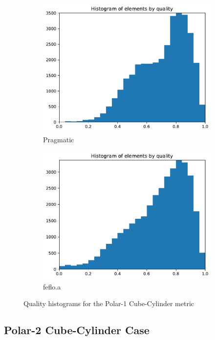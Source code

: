 \documentclass[3p,times,procedia,number]{elsarticle}
\begin{document}
\begin{figure}
\begin{subfigure}{.16\textwidth}
\includegraphics[width=\textwidth]{pragmatic-cube-cylinder-polar-1-quality.pdf}
\caption{Pragmatic}
\end{subfigure}
\begin{subfigure}{.16\textwidth}
\centering
\includegraphics[width=\textwidth]{fefloa-cube-cylinder-polar-1-quality.pdf}
\caption{feflo.a}
\end{subfigure}
\caption{Quality histograms for the Polar-1 Cube-Cylinder metric}
\label{fig:cube-cylinder-polar-1-qualities}
\end{figure}

\subsection{Polar-2 Cube-Cylinder Case}
\label{sec:cube-cylinder-polar-2}
\end{document}

